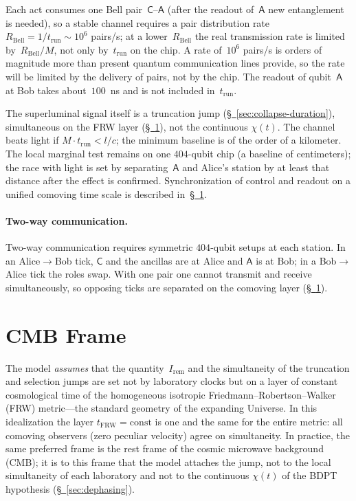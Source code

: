 \documentclass[11pt,a4paper]{article}
\newcommand{\Ost}{I_{\mathrm{rem}}}
\newcommand{\qC}{\mathsf{C}}
\newcommand{\qA}{\mathsf{A}}
\begin{document}
Each act consumes one Bell pair~$\qC$--$\qA$ (after the readout of~$\qA$ new entanglement is needed), so a stable channel requires a pair distribution rate $R_{\mathrm{Bell}}=1/t_{\mathrm{run}}\sim10^6$ pairs/s; at a lower~$R_{\mathrm{Bell}}$ the real transmission rate is limited by~$R_{\mathrm{Bell}}/M$, not only by~$t_{\mathrm{run}}$ on the chip. A rate of~$10^6$ pairs/s is orders of magnitude more than present quantum communication lines provide, so the rate will be limited by the delivery of pairs, not by the chip. The readout of qubit~$\qA$ at Bob takes about~$100$~ns and is not included in~$t_{\mathrm{run}}$.

The superluminal signal itself is a truncation jump (\hyperref[sec:collapse-duration]{\S~\ref*{sec:collapse-duration}}), simultaneous on the FRW layer (\hyperref[sec:comoving]{\S~\ref*{sec:comoving}}), not the continuous $\chi(t)$. The channel beats light if $M\cdot t_{\mathrm{run}}<l/c$; the minimum baseline is of the order of a kilometer. The local marginal test remains on one $404$-qubit chip (a baseline of centimeters); the race with light is set by separating~$\qA$ and Alice's station by at least that distance after the effect is confirmed. Synchronization of control and readout on a unified comoving time scale is described in~\hyperref[sec:comoving]{\S~\ref*{sec:comoving}}.

\paragraph{Two-way communication.}
Two-way communication requires symmetric $404$-qubit setups at each station. In an Alice$\to$Bob tick, $\qC$ and the ancillas are at Alice and $\qA$ is at Bob; in a Bob$\to$Alice tick the roles swap. With one pair one cannot transmit and receive simultaneously, so opposing ticks are separated on the comoving layer (\hyperref[sec:comoving]{\S~\ref*{sec:comoving}}).

\section{CMB Frame}
\label{sec:comoving}

The model \emph{assumes} that the quantity~$\Ost$ and the simultaneity of the truncation and selection jumps are set not by laboratory clocks but on a layer of constant cosmological time of the homogeneous isotropic Friedmann--Robertson--Walker (FRW) metric---the standard geometry of the expanding Universe. In this idealization the layer $t_{\mathrm{FRW}}=\mathrm{const}$ is one and the same for the entire metric: all comoving observers (zero peculiar velocity) agree on simultaneity. In practice, the same preferred frame is the rest frame of the cosmic microwave background (CMB); it is to this frame that the model attaches the jump, not to the local simultaneity of each laboratory and not to the continuous $\chi(t)$ of the BDPT hypothesis (\hyperref[sec:dephasing]{\S~\ref*{sec:dephasing}}).
\end{document}
